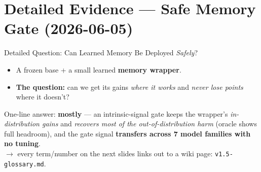 \section{Detailed Evidence --- Safe Memory Gate (2026-06-05)}

\begin{frame}{Detailed Question: Can Learned Memory Be Deployed \emph{Safely}?}
  \large
  \begin{itemize}
    \item A frozen base + a small learned \textbf{memory wrapper}.
    \item \textbf{The question:} can we get its gains \emph{where it works} and \emph{never lose points} where it doesn't?
  \end{itemize}
  \vspace{1em}
  \normalsize One-line answer: \textbf{mostly} --- an intrinsic-signal gate keeps the wrapper's
  \emph{in-distribution gains} and \emph{recovers most of the out-of-distribution harm}
  (oracle shows full headroom), and the gate signal \textbf{transfers across 7 model families with no tuning}.
  \vspace{1.2em}\\
  \footnotesize $\rightarrow$ every term/number on the next slides links out to a wiki page: \texttt{v1.5-glossary.md}.
\end{frame}


